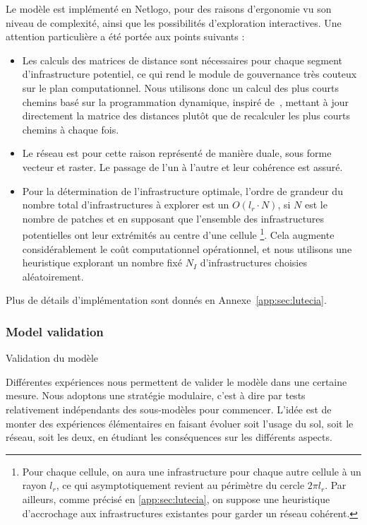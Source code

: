 Le modèle est implémenté en Netlogo, pour des raisons d'ergonomie vu son niveau de complexité, ainsi que les possibilités d'exploration interactives. Une attention particulière a été portée aux points suivants :
\begin{itemize}
	\item Les calculs des matrices de distance sont nécessaires pour chaque segment d'infrastructure potentiel, ce qui rend le module de gouvernance très couteux sur le plan computationnel. Nous utilisons donc un calcul des plus courts chemins basé sur la programmation dynamique, inspiré de~\cite{tretyakov2011fast}, mettant à jour directement la matrice des distances plutôt que de recalculer les plus courts chemins à chaque fois.
	\item Le réseau est pour cette raison représenté de manière duale, sous forme vecteur et raster. Le passage de l'un à l'autre et leur cohérence est assuré.
	\item Pour la détermination de l'infrastructure optimale, l'ordre de grandeur du nombre total d'infrastructures à explorer est un $O(l_r\cdot N)$, si $N$ est le nombre de patches et en supposant que l'ensemble des infrastructures potentielles ont leur extrémités au centre d'une cellule \footnote{Pour chaque cellule, on aura une infrastructure pour chaque autre cellule à un rayon $l_r$, ce qui asymptotiquement revient au périmètre du cercle $2\pi l_r$. Par ailleurs, comme précisé en \ref{app:sec:lutecia}, on suppose une heuristique d'accrochage aux infrastructures existantes pour garder un réseau cohérent.}. Cela augmente considérablement le coût computationnel opérationnel, et nous utilisons une heuristique explorant un nombre fixé $N_I$ d'infrastructures choisies aléatoirement.
\end{itemize}


Plus de détails d'implémentation sont donnés en Annexe~\ref{app:sec:lutecia}.




\subsubsection{Model validation}{Validation du modèle}


Différentes expériences nous permettent de valider le modèle dans une certaine mesure. Nous adoptons une stratégie modulaire, c'est à dire par tests relativement indépendants des sous-modèles pour commencer. L'idée est de monter des expériences élémentaires en faisant évoluer soit l'usage du sol, soit le réseau, soit les deux, en étudiant les conséquences sur les différents aspects.


